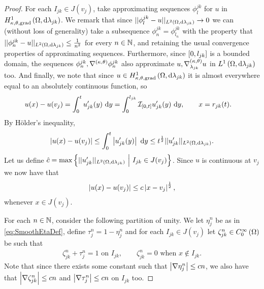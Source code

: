 \begin{proof}
	For each $I_{jk}\in J(v_j)$, take approximating sequences $\phi_l^{jk}$ for $u$ in $H^1_{\kappa,\theta,\mathrm{grad}}\left( \Omega, \mathrm{d}\lambda_{jk} \right)$.
	We remark that since $\lvert\lvert \phi_l^{jk}-u \rvert\rvert_{L^{2}\left( \Omega,\mathrm{d} \lambda_{jk} \right)}\rightarrow 0$ we can (without loss of generality) take a subsequence $\phi_n^{jk} = \phi_{l_n}^{jk}$ with the property that$\lvert\lvert \phi_n^{jk}-u \rvert\rvert_{L^{2}\left( \Omega,\mathrm{d} \lambda_{jk} \right)} \leq \frac{1}{n^2}$ for every $n\in\mathbb{N}$, and retaining the usual convergence properties of approximating sequences.
	Furthermore, since $\left[ 0,l_{jk} \right]$ is a bounded domain, the sequences $\phi_n^{jk}, \nabla^{\left( \kappa, \theta \right)}\phi_n^{jk}$ also approximate $u, \nabla^{\left( \kappa, \theta \right)}_{\lambda_{jk}}u$ in $L^1\left( \Omega,\mathrm{d}\lambda_{jk} \right)$ too.
	And finally, we note that since $u\in H^1_{\kappa,\theta,\mathrm{grad}}\left( \Omega, \mathrm{d}\lambda_{jk} \right)$ it is almost everywhere equal to an absolutely continuous function, so
	\begin{align*}
		u(x)-u(v_j) 
		&= \int_0^t u_{jk}'(y) \ \mathrm{d} y 
		= \int_0^{l_{jk}} \mathcal{I}_{\left[ 0,t \right]}u_{jk}'(y) \ \mathrm{d} y, 
		\qquad x=r_{jk}(t).
	\end{align*}
	By H\"{o}lder's inequality,
	\begin{align*}
		\left\lvert  u(x)-u(v_j)  \right\rvert 
		\leq \int_0^t \left\lvert u_{jk}'(y) \right\rvert \ \mathrm{d} y
		\leq t^{\frac{1}{2}} \lvert\lvert u_{jk}' \rvert\rvert_{L^{2}\left( \Omega,\mathrm{d} \lambda_{jk} \right)}.
	\end{align*}
	Let us define $\hat{c} = \max\left\{  \lvert\lvert u'_{jk} \rvert\rvert_{L^{2}\left( \Omega,\mathrm{d} \lambda_{jk} \right)} \ \middle\vert \  I_{jk} \in J(v_j) \right\}$.
	Since $u$ is continuous at $v_j$ we now have that
	\begin{align*}
		\left\lvert  u(x)-u(v_j)  \right\rvert \leq c\left\lvert x-v_j \right\rvert^{\frac{1}{2}},
	\end{align*}
	whenever $x\in J(v_j)$.
	
	For each $n\in\mathbb{N}$, consider the following partition of unity.
	We let $\eta_j^n$ be as in \eqref{eq:SmoothEtaDef}, define $\tau_j^n = 1-\eta_j^n$ and for each $I_{jk}\in J(v_j)$ let $\zeta_{jk}^n\in C^{\infty}_{0}\left( \Omega \right)$ be such that
	\begin{align*}
		\zeta_{jk}^n + \tau_j^n = 1 \text{ on } I_{jk}, 
		\qquad \zeta_{jk}^n = 0 \text{ when } x\not\in I_{jk}.
	\end{align*}
	Note that since there exists some constant such that $\left\lvert \nabla\eta_j^n \right\rvert\leq cn$, we also have that $\left\lvert \nabla\zeta_{jk}^n \right\rvert\leq cn$ and $\left\lvert \nabla\tau_j^n \right\rvert\leq cn$ on $I_{jk}$ too.
	

\end{proof}
